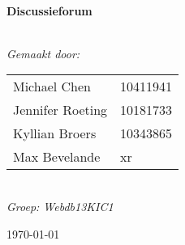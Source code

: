 \begin{titlepage}

\begin{center}


\HRule \\[0.4cm]
{ \huge \bfseries Discussieforum}\\[0.4cm]
\HRule \\[0.4cm]

\vfill

\end{center}

\begin{minipage}{0.4\textwidth}
\begin{flushleft} \large
\emph{Gemaakt door:}\\[0.5cm]
\begin{tabular}{ll}
Michael Chen & 10411941\\
Jennifer Roeting &10181733\\
Kyllian Broers &10343865\\
Max Bevelande& xr\\
\end{tabular}\\[0.5cm]
\emph{Groep: Webdb13KIC1}
\end{flushleft}

\end{minipage}
\vfill
{\large \today}

\end{titlepage}